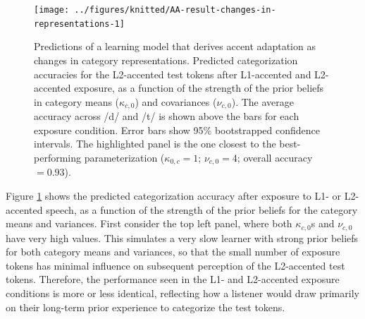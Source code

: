 \documentclass[
  11pt,
  man,floatsintext]{apa6}
\begin{document}
\begin{figure}

{\centering \texttt{[image: ../figures/knitted/AA-result-changes-in-representations-1]} 

}

\caption{Predictions of a learning model that derives accent adaptation as changes in category representations. Predicted categorization accuracies for the L2-accented test tokens after L1-accented and L2-accented exposure, as a function of the strength of the prior beliefs in category means (\(\kappa_{c,0}\)) and covariances (\(\nu_{c,0}\)). The average accuracy across /d/ and /t/ is shown above the bars for each exposure condition. Error bars show 95\% bootstrapped confidence intervals. The highlighted panel is the one closest to the best-performing parameterization (\(\kappa_{0,c} = 1\); \(\nu_{c,0}=4\); overall accuracy \(=0.93\)).}\label{fig:AA-result-changes-in-representations}
\end{figure}

Figure \ref{fig:AA-result-changes-in-representations} shows the predicted categorization accuracy after exposure to L1- or L2-accented speech, as a function of the strength of the prior beliefs for the category means and variances. First consider the top left panel, where both \(\kappa_{c,0}\)s and \(\nu_{c,0}\) have very high values. This simulates a very slow learner with strong prior beliefs for both category means and variances, so that the small number of exposure tokens has minimal influence on subsequent perception of the L2-accented test tokens. Therefore, the performance seen in the L1- and L2-accented exposure conditions is more or less identical, reflecting how a listener would draw primarily on their long-term prior experience to categorize the test tokens.
\end{document}
